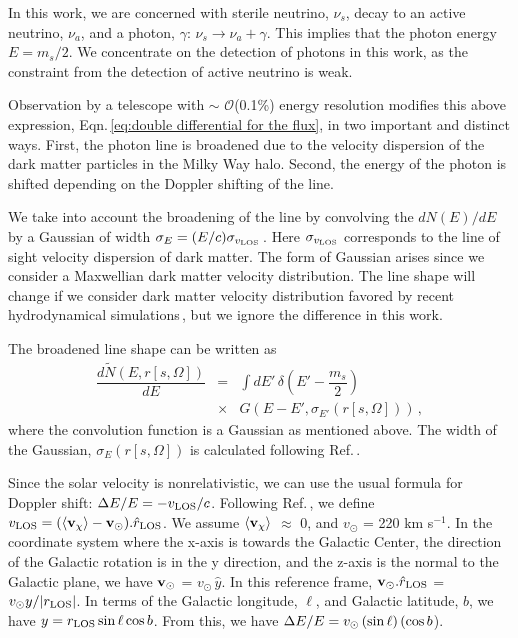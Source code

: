 \documentclass[aps,prd,10pt,twocolumn,superscriptaddress,showpacs]{revtex4-1}
\begin{document}
In this work, we are concerned with sterile neutrino, $\nu_s$, decay to an active neutrino, $\nu_a$, and a photon, $\gamma$: $\nu_s \rightarrow \nu_a + \gamma$.  This implies that the photon energy $E = m_s/2$.  We concentrate on the detection of photons in this work, as the constraint from the detection of active neutrino is weak.

Observation by a telescope with $\sim$ $\mathcal{O}$(0.1\%) energy resolution modifies this above expression, Eqn.\,\ref{eq:double differential for the flux}, in two important and distinct ways.  First, the photon line is broadened due to the velocity dispersion of the dark matter particles in the Milky Way halo.  Second, the energy of the photon is shifted depending on the Doppler shifting of the line.  

We take into account the broadening of the line by convolving the $dN(E)/dE$ by a Gaussian of width $\sigma_E = (E/c) \sigma_{v_{\rm LOS}}$\,\cite{speckhard2016}.  Here $\sigma_{v_{\rm LOS}}$ corresponds to the line of sight velocity dispersion of dark matter.  The form of Gaussian arises since we consider a Maxwellian dark matter velocity distribution.  The line shape will change if we consider dark matter velocity distribution favored by recent hydrodynamical simulations\,\cite{Bozorgnia:2016ogo,Sloane:2016kyi,Kelso:2016qqj}, but we ignore the difference in this work.  

The broadened line shape can be written as 
\begin{eqnarray}
\dfrac{d \tilde{N} (E, r[s, \Omega])}{dE} &=& \int dE' \, \delta \left(E' - \dfrac{m_s}{2} \right) \nonumber\\
&\times& G(E - E', \sigma_{E'} (r[s, \Omega])) \, ,
\label{eq:formula for modified dNdE}
\end{eqnarray}
where the convolution function is a Gaussian as mentioned above.  The width of the Gaussian, $\sigma_E (r[s, \Omega])$ is calculated following Ref.\,\cite{speckhard2016}.

Since the solar velocity is nonrelativistic, we can use the usual formula for Doppler shift: $\Delta E/E = - v_{\rm LOS}/c$.  Following Ref.\,\cite{speckhard2016}, we define $v_{\rm LOS} = (\langle {\bf v}_\chi \rangle - {\bf v}_\odot).\hat{r}_{\rm LOS}$.  We assume $\langle {\bf v}_\chi \rangle$ $\approx$ 0, and $v_\odot$ = 220 km s$^{-1}$.  In the coordinate system where the x-axis is towards the Galactic Center, the direction of the Galactic rotation is in the y direction, and the z-axis is the normal to the Galactic plane, we have ${\bf v}_\odot$ = $v_\odot \, \hat{y}$.  In this reference frame, ${\bf v}_\odot . \hat{r}_{\rm LOS}$ = $v_\odot y / |r_{\rm LOS}|$.  In terms of the Galactic longitude, $\ell$, and Galactic latitude, $b$, we have $y = r_{\rm LOS} \, {\rm sin} \, \ell \, {\rm cos} \, b$.  From this, we have $\Delta E/E = v_\odot \, ({\rm sin} \, \ell) \, ({\rm cos} \, b$).
\end{document}
